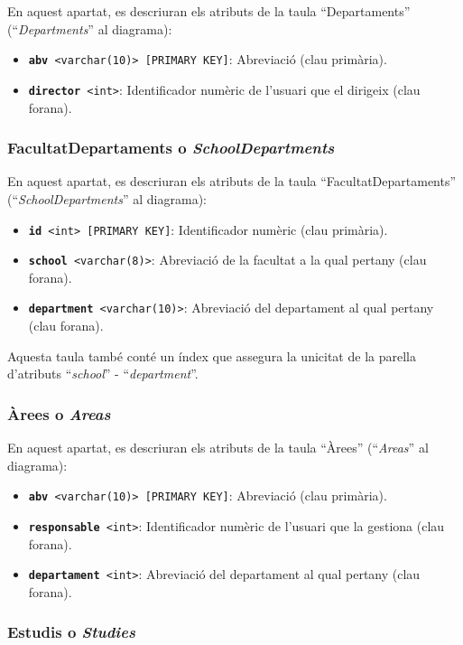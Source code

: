 \documentclass[a4paper,12pt]{ThesisStyle}
\begin{document}
En aquest apartat, es descriuran els atributs de la taula ``Departaments'' (``\textit{Departments}'' al diagrama):
\begin{itemize}
  \item \texttt{\textbf{abv} <varchar(10)> [PRIMARY KEY]}: Abreviació (clau primària).
  \item \texttt{\textbf{director} <int>}: Identificador numèric de l'usuari que el dirigeix (clau forana).
\end{itemize}

\subsubsection{FacultatDepartaments o \textit{SchoolDepartments}}

En aquest apartat, es descriuran els atributs de la taula ``FacultatDepartaments'' (``\textit{SchoolDepartments}'' al diagrama):
\begin{itemize}
  \item \texttt{\textbf{id} <int> [PRIMARY KEY]}: Identificador numèric (clau primària).
  \item \texttt{\textbf{school} <varchar(8)>}: Abreviació de la facultat a la qual pertany (clau forana).
  \item \texttt{\textbf{department} <varchar(10)>}: Abreviació del departament al qual pertany (clau forana).
\end{itemize}

Aquesta taula també conté un índex que assegura la unicitat de la parella d'atributs ``\textit{school}'' - ``\textit{department}''.

\subsubsection{Àrees o \textit{Areas}}

En aquest apartat, es descriuran els atributs de la taula ``Àrees'' (``\textit{Areas}'' al diagrama):
\begin{itemize}
  \item \texttt{\textbf{abv} <varchar(10)> [PRIMARY KEY]}: Abreviació (clau primària).
  \item \texttt{\textbf{responsable} <int>}: Identificador numèric de l'usuari que la gestiona (clau forana).
  \item \texttt{\textbf{departament} <int>}: Abreviació del departament al qual pertany (clau forana).
\end{itemize}

\subsubsection{Estudis o \textit{Studies}}
\end{document}
